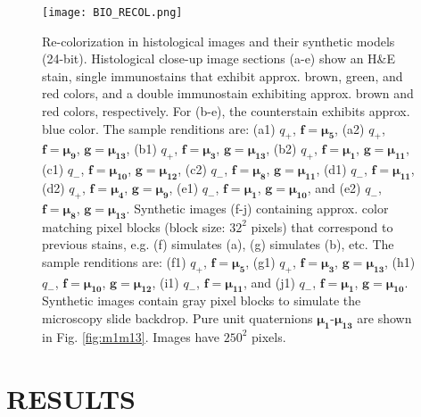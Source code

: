 \documentclass[superscriptaddress,longbibliography,aps,prl,twocolumn,10pt]{revtex4-2}
\begin{document}
\begin{figure}[t]
\centering
\texttt{[image: BIO\_RECOL.png]}
\vspace{-12pt}
\caption{\footnotesize{Re-colorization in histological images and their synthetic models (24-bit). Histological close-up image sections (a-e) show an H\&E stain, single immunostains that exhibit approx. brown, green, and red colors, and a double immunostain exhibiting approx. brown and red colors, respectively. For (b-e), the counterstain exhibits approx. blue color. The sample renditions are: (a1) $q_+$, $\boldsymbol{f} = \boldsymbol{\mu_{5}}$, (a2) $q_+$, $\boldsymbol{f} = \boldsymbol{\mu_{9}}$, $\boldsymbol{g} = \boldsymbol{\mu_{13}}$, (b1) $q_+$, $\boldsymbol{f} = \boldsymbol{\mu_{3}}$, $\boldsymbol{g} = \boldsymbol{\mu_{13}}$, (b2) $q_+$, $\boldsymbol{f} = \boldsymbol{\mu_{1}}$, $\boldsymbol{g} = \boldsymbol{\mu_{11}}$, (c1) $q_-$, $\boldsymbol{f} = \boldsymbol{\mu_{10}}$, $\boldsymbol{g} = \boldsymbol{\mu_{12}}$, (c2) $q_-$, $\boldsymbol{f} = \boldsymbol{\mu_{8}}$, $\boldsymbol{g} = \boldsymbol{\mu_{11}}$, (d1) $q_-$, $\boldsymbol{f} = \boldsymbol{\mu_{11}}$, (d2) $q_+$, $\boldsymbol{f} = \boldsymbol{\mu_{4}}$, $\boldsymbol{g} = \boldsymbol{\mu_{9}}$, (e1) $q_-$, $\boldsymbol{f} = \boldsymbol{\mu_{1}}$, $\boldsymbol{g} = \boldsymbol{\mu_{10}}$, and (e2) $q_-$, $\boldsymbol{f} = \boldsymbol{\mu_{8}}$, $\boldsymbol{g} = \boldsymbol{\mu_{13}}$. Synthetic images (f-j) containing approx. color matching pixel blocks (block size: $32^2$ pixels) that correspond to previous stains, e.g. (f) simulates (a), (g) simulates (b), etc. The sample renditions are: (f1) $q_+$, $\boldsymbol{f} = \boldsymbol{\mu_{5}}$, (g1) $q_+$, $\boldsymbol{f} = \boldsymbol{\mu_{3}}$, $\boldsymbol{g} = \boldsymbol{\mu_{13}}$, (h1) $q_-$, $\boldsymbol{f} = \boldsymbol{\mu_{10}}$, $\boldsymbol{g} = \boldsymbol{\mu_{12}}$, (i1) $q_-$, $\boldsymbol{f} = \boldsymbol{\mu_{11}}$, and (j1) $q_-$, $\boldsymbol{f} = \boldsymbol{\mu_{1}}$, $\boldsymbol{g} = \boldsymbol{\mu_{10}}$. Synthetic images contain gray pixel blocks to simulate the microscopy slide backdrop. Pure unit quaternions $\boldsymbol{\mu_{1}}$-$\boldsymbol{\mu_{13}}$ are shown in Fig. \ref{fig:m1m13}. Images have $250^2$ pixels.}}
\label{fig:img_recol_bio}
\end{figure}


\section*{\large\uppercase{Results}}
\end{document}
